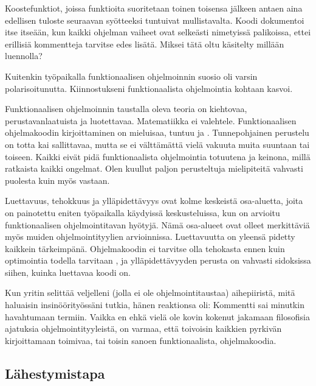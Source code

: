 Koostefunktiot, joissa funktioita suoritetaan toinen toisensa jälkeen antaen aina edellisen tuloste seuraavan syötteeksi tuntuivat mullistavalta. Koodi dokumentoi itse itseään, kun kaikki ohjelman vaiheet ovat selkeästi nimetyissä palikoissa, ettei erillisiä kommentteja tarvitse edes lisätä. Miksei tätä oltu käsitelty millään luennolla?

Kuitenkin työpaikalla funktionaalisen ohjelmoinnin suosio oli varsin polarisoitunutta. Kiinnostukseni funktionaalista ohjelmointia kohtaan kasvoi.

Funktionaalisen ohjelmoinnin taustalla oleva teoria on kiehtovaa, perustavanlaatuista ja luotettavaa. Matematiikka ei valehtele. Funktionaalisen ohjelmakoodin kirjoittaminen on mieluisaa, tuntuu  ja . Tunnepohjainen perustelu on totta kai sallittavaa, mutta se ei välttämättä vielä vakuuta muita suuntaan tai toiseen. Kaikki eivät pidä funktionaalista ohjelmointia totuutena ja keinona, millä ratkaista kaikki ongelmat. Olen kuullut paljon perusteltuja mielipiteitä vahvasti  puolesta kuin myös vastaan.

Luettavuus, tehokkuus ja ylläpidettävyys ovat kolme keskeistä osa-aluetta, joita on painotettu eniten työpaikalla käydyissä keskusteluissa, kun on arvioitu funktionaalisen ohjelmointitavan hyötyjä. Nämä osa-alueet ovat olleet merkittäviä myös muiden ohjelmointityylien arvioinnissa. Luettavuutta on yleensä pidetty kaikkein tärkeimpänä. Ohjelmakoodin ei tarvitse olla tehokasta ennen kuin optimointia todella tarvitaan \cite{prematureoptimization}, ja ylläpidettävyyden perusta on vahvasti sidoksissa siihen, kuinka luettavaa koodi on.

Kun yritin selittää veljelleni (jolla ei ole ohjelmointitaustaa) aihepiiristä, mitä haluaisin insinöörityössäni tutkia, hänen reaktionsa oli:  Kommentti sai minutkin havahtumaan termiin. Vaikka en ehkä vielä ole kovin kokenut jakamaan filosofisia ajatuksia ohjelmointityyleistä, on varmaa, että toivoisin kaikkien pyrkivän kirjoittamaan toimivaa, tai toisin sanoen funktionaalista, ohjelmakoodia.

\subsection{Lähestymistapa}


